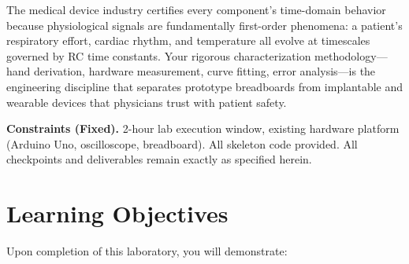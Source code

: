 \documentclass[11pt,letterpaper]{article}
\begin{document}
\noindent
The medical device industry certifies every component's time-domain behavior because physiological signals are fundamentally first-order phenomena: a patient's respiratory effort, cardiac rhythm, and temperature all evolve at timescales governed by RC time constants. Your rigorous characterization methodology---hand derivation, hardware measurement, curve fitting, error analysis---is the engineering discipline that separates prototype breadboards from implantable and wearable devices that physicians trust with patient safety.

\noindent
\textbf{Constraints (Fixed).} 2-hour lab execution window, existing hardware platform (Arduino Uno, oscilloscope, breadboard). All skeleton code provided. All checkpoints and deliverables remain exactly as specified herein.

\clearpage

\section{Learning Objectives}

Upon completion of this laboratory, you will demonstrate:
\end{document}
